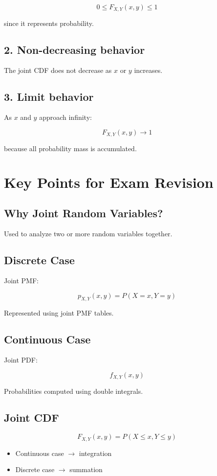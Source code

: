 \documentclass[12pt]{article}
\begin{document}
\[
0 \le F_{X,Y}(x,y) \le 1
\]

since it represents probability.

\subsection{2. Non-decreasing behavior}

The joint CDF does not decrease as $x$ or $y$ increases.

\subsection{3. Limit behavior}

As $x$ and $y$ approach infinity:

\[
F_{X,Y}(x,y)\rightarrow 1
\]

because all probability mass is accumulated.

\section{Key Points for Exam Revision}

\subsection{Why Joint Random Variables?}

Used to analyze two or more random variables together.

\subsection{Discrete Case}

Joint PMF:

\[
p_{X,Y}(x,y)=P(X=x,Y=y)
\]

Represented using joint PMF tables.

\subsection{Continuous Case}

Joint PDF:

\[
f_{X,Y}(x,y)
\]

Probabilities computed using double integrals.

\subsection{Joint CDF}

\[
F_{X,Y}(x,y)=P(X\le x,Y\le y)
\]

\begin{itemize}
\item Continuous case $\rightarrow$ integration
\item Discrete case $\rightarrow$ summation
\end{itemize}
\end{document}
